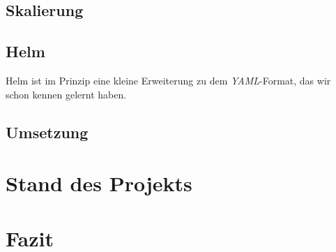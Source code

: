 \documentclass[12pt,a4paper]{scrartcl}
\begin{document}
\subsection{Skalierung} 



\subsection{Helm}

Helm ist im Prinzip eine kleine Erweiterung zu dem \emph{YAML}-Format, das wir schon kennen gelernt haben. 

\subsection{Umsetzung}



\section{Stand des Projekts} \label{project_status}



\section{Fazit}\label{conclusion}

\newpage


\printbibliography
{}
\end{document}
